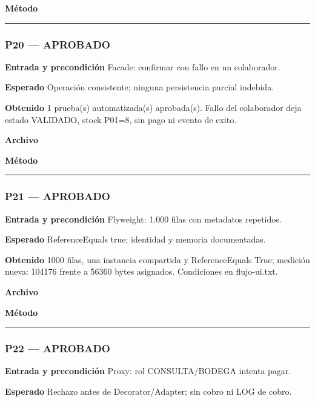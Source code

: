 \textbf{Método} 

\medskip\hrule\medskip
\subsubsection*{P20 --- APROBADO}
\textbf{Entrada y precondición} Facade: confirmar con fallo en un colaborador.

\textbf{Esperado} Operación consistente; ninguna persistencia parcial indebida.

\textbf{Obtenido} 1 prueba(s) automatizada(s) aprobada(s). Fallo del colaborador deja estado VALIDADO, stock P01=8, sin pago ni evento de exito.

\textbf{Archivo} \href{https://github.com/Alan77-bot/LogiMarket360Alan/blob/68bda51063441415524ede51bdf61649ee9b4973/tests/LogiMarket.Tests/Aplicacion/ConfirmacionTests.cs}{}

\textbf{Método} 

\medskip\hrule\medskip
\subsubsection*{P21 --- APROBADO}
\textbf{Entrada y precondición} Flyweight: 1.000 filas con metadatos repetidos.

\textbf{Esperado} ReferenceEquals true; identidad y memoria documentadas.

\textbf{Obtenido} 1000 filas, una instancia compartida y ReferenceEquals True; medición nueva: 104176 frente a 56360 bytes asignados. Condiciones en flujo-ui.txt.

\textbf{Archivo} \href{https://github.com/Alan77-bot/LogiMarket360Alan/blob/68bda51063441415524ede51bdf61649ee9b4973/tests/LogiMarket.Tests/Patrones/EstructuralesTests.cs}{}

\textbf{Método} 

\medskip\hrule\medskip
\subsubsection*{P22 --- APROBADO}
\textbf{Entrada y precondición} Proxy: rol CONSULTA/BODEGA intenta pagar.

\textbf{Esperado} Rechazo antes de Decorator/Adapter; sin cobro ni LOG de cobro.

